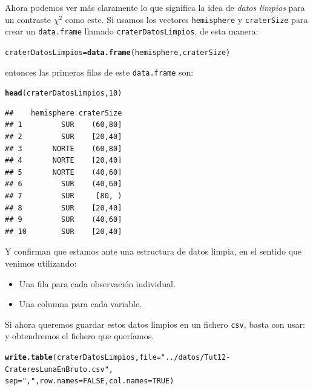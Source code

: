 \documentclass[10pt,a4paper]{article}\usepackage[]{graphicx}\usepackage[]{color}
\makeatletter
\newcommand{\hlnum}[1]{\textcolor[rgb]{0.686,0.059,0.569}{#1}}%
\newcommand{\hlstr}[1]{\textcolor[rgb]{0.192,0.494,0.8}{#1}}%
\newcommand{\hlstd}[1]{\textcolor[rgb]{0.345,0.345,0.345}{#1}}%
\newcommand{\hlkwb}[1]{\textcolor[rgb]{0.69,0.353,0.396}{#1}}%
\newcommand{\hlkwc}[1]{\textcolor[rgb]{0.333,0.667,0.333}{#1}}%
\newcommand{\hlkwd}[1]{\textcolor[rgb]{0.737,0.353,0.396}{\textbf{#1}}}%
\newenvironment{kframe}{%
 \def\at@end@of@kframe{}%
 \ifinner\ifhmode%
  \def\at@end@of@kframe{\end{minipage}}%
  \begin{minipage}{\columnwidth}%
 \fi\fi%
 \def\FrameCommand##1{\hskip\@totalleftmargin \hskip-\fboxsep
 \colorbox{shadecolor}{##1}\hskip-\fboxsep
     \hskip-\linewidth \hskip-\@totalleftmargin \hskip\columnwidth}%
 \MakeFramed {\advance\hsize-\width
   \@totalleftmargin\z@ \linewidth\hsize
   \@setminipage}}%
 {\par\unskip\endMakeFramed%
 \at@end@of@kframe}
\newenvironment{knitrout}{}{} %
\newcounter {cont01}
\makeatother
\begin{document}
Ahora  podemos ver más claramente lo que significa la idea de {\em datos limpios} para un contraste $\chi^2$  como este. Si usamos los vectores {\tt hemisphere} y {\tt craterSize} para crear un {\tt data.frame} llamado {\tt craterDatosLimpios}, de esta manera:
\begin{knitrout}
\color{fgcolor}\begin{kframe}
\begin{alltt}
\hlstd{craterDatosLimpios} \hlkwb{=} \hlkwd{data.frame}\hlstd{(hemisphere, craterSize)}
\end{alltt}
\end{kframe}
\end{knitrout}
entonces las primeras filas de este {\tt data.frame} son:
\begin{knitrout}
\color{fgcolor}\begin{kframe}
\begin{alltt}
\hlkwd{head}\hlstd{(craterDatosLimpios,}\hlnum{10}\hlstd{)}
\end{alltt}
\begin{verbatim}
##    hemisphere craterSize
## 1         SUR    (60,80]
## 2         SUR    [20,40]
## 3       NORTE    (60,80]
## 4       NORTE    [20,40]
## 5       NORTE    (40,60]
## 6         SUR    (40,60]
## 7         SUR     [80, )
## 8         SUR    [20,40]
## 9         SUR    (40,60]
## 10        SUR    [20,40]
\end{verbatim}
\end{kframe}
\end{knitrout}
Y confirman que estamos ante una estructura de datos limpia, en el sentido que venimos utilizando:
\begin{itemize}
  \item Una fila para cada observación individual.
  \item Una columna para cada variable.
\end{itemize}
Si ahora queremos guardar estos datos limpios en un fichero {\tt csv}, basta con usar:
y obtendremos el fichero que queríamos.
\begin{knitrout}
\color{fgcolor}\begin{kframe}
\begin{alltt}
\hlkwd{write.table}\hlstd{(craterDatosLimpios,} \hlkwc{file}\hlstd{=}\hlstr{"../datos/Tut12-CrateresLunaEnBruto.csv"}\hlstd{,}
    \hlkwc{sep}\hlstd{=}\hlstr{","}\hlstd{,} \hlkwc{row.names}\hlstd{=}\hlnum{FALSE}\hlstd{,} \hlkwc{col.names}\hlstd{=}\hlnum{TRUE}\hlstd{)}
\end{alltt}
\end{kframe}
\end{knitrout}
\end{document}
